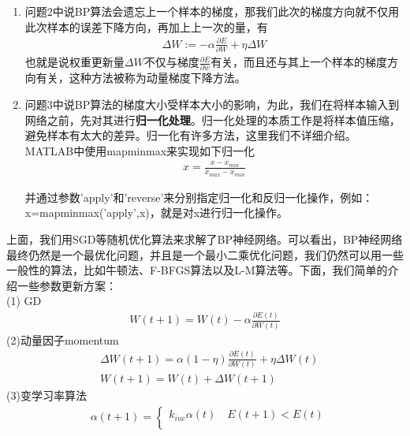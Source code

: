 {\begin{enumerate}
            让$\alpha,\beta$在$\Delta W$前后相差不大(即前后梯度方向相似的)时较大；让$\alpha,\beta$在平均梯度方向上较大；当前后两次的梯度方向符号一致时，增大$\alpha,\beta$。
            \item 问题2中说BP算法会遗忘上一个样本的梯度，那我们此次的梯度方向就不仅用此次样本的误差下降方向，再加上上一次的量，有
            \begin{align*}
            \Delta W := -\alpha\frac{\partial E}{\partial W} + \eta \Delta W
            \end{align*}
            也就是说权重更新量$\Delta W$不仅与梯度$\frac{\partial E}{\partial w}$有关，而且还与其上一个样本的梯度方向有关，这种方法被称为动量梯度下降方法。
            \item 问题3中说BP算法的梯度大小受样本大小的影响，为此，我们在将样本输入到网络之前，先对其进行\textbf{归一化处理}。归一化处理的本质工作是将样本值压缩，避免样本有太大的差异。归一化有许多方法，这里我们不详细介绍。MATLAB中使用mapminmax来实现如下归一化
            \begin{align*}
            x = \frac{x-x_{min}}{x_{max} - x_{min}}
            \end{align*}
            \par
            并通过参数'apply'和'reverse'来分别指定归一化和反归一化操作，例如：x=mapminmax('apply',x)，就是对x进行归一化操作。
            \end{enumerate}
            \par
            上面，我们用SGD等随机优化算法来求解了BP神经网络。可以看出，BP神经网络最终仍然是一个最优化问题，并且是一个最小二乘优化问题，我们仍然可以用一些一般性的算法，比如牛顿法、F-BFGS算法以及L-M算法等。下面，我们简单的介绍一些参数更新方案：\\
            (1) GD
            \begin{align*}
            W(t+1)= W(t)-\alpha \frac{\partial E(t)}{\partial W(t)}
            \end{align*}
            (2)动量因子momentum
            \begin{align*}
            & \Delta W(t+1)= \alpha(1-\eta)\frac{\partial E(t)}{\partial W(t)} + \eta \Delta W(t)\\
            & W(t+1)=W(t)+\Delta W(t+1)
            \end{align*}
            (3)变学习率算法
            \begin{align*}
            &\alpha(t+1)=
            \left\{
            \begin{aligned}
            k_{inc}\alpha(t) \quad E(t+1)<E(t)\\

\end{aligned}
\end{align*}}
